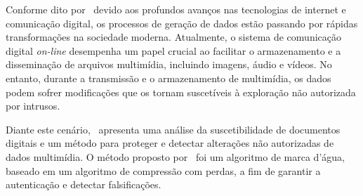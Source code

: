 Conforme dito por~\textcite{kabir2021} devido aos profundos avanços nas
tecnologias de internet e comunicação digital,
os processos de geração de dados estão passando por rápidas transformações na
sociedade moderna.
Atualmente, o sistema de comunicação digital \textit{on-line} desempenha um papel
crucial ao facilitar o armazenamento e a disseminação de arquivos multimídia,
incluindo imagens, áudio e vídeos.
No entanto, durante a transmissão e o armazenamento de multimídia,
os dados podem sofrer modificações que os tornam suscetíveis à exploração
não autorizada por intrusos\cite{kabir2021}.

Diante este cenário,~\textcite{kabir2021} apresenta uma análise da
suscetibilidade de documentos digitais e um método para proteger e detectar
alterações não autorizadas de dados multimídia.
O método proposto por~\textcite{kabir2021} foi um algoritmo de marca d'água,
baseado em um algoritmo de compressão com perdas, a fim de garantir a
autenticação e detectar falsificações.
